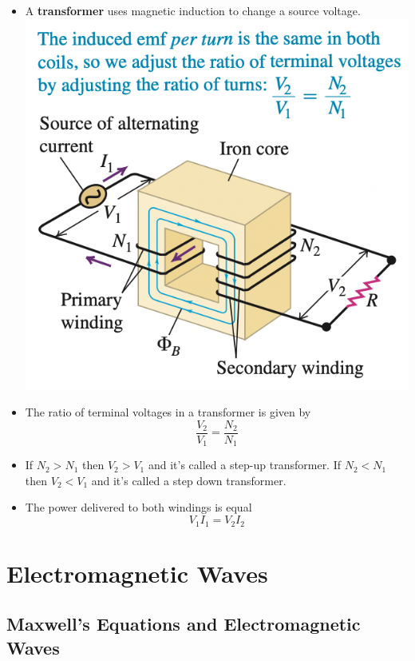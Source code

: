 \documentclass{article}
\begin{document}
\begin{itemize}
  \item A \textbf{transformer} uses magnetic induction to change a source voltage. \\ \includegraphics[scale=0.75]{transformer}

  \item The ratio of terminal voltages in a transformer is given by \[\frac{V_2}{V_1} = \frac{N_2}{N_1}\]

  \item If $N_2 > N_1$ then $V_2 > V_1$ and it's called a step-up transformer. If $N_2 < N_1$ then $V_2 < V_1$ and it's called a step down transformer.

  \item The power delivered to both windings is equal \[V_1 I_1 = V_2 I_2\]
\end{itemize}

\section{Electromagnetic Waves}

\subsection{Maxwell's Equations and Electromagnetic Waves}
\end{document}
